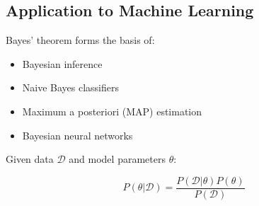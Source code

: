 \subsection{Application to Machine Learning}

Bayes' theorem forms the basis of:
\begin{itemize}
    \item Bayesian inference
    \item Naive Bayes classifiers
    \item Maximum a posteriori (MAP) estimation
    \item Bayesian neural networks
\end{itemize}

Given data $\mathcal{D}$ and model parameters $\theta$:

\begin{equation}
P(\theta|\mathcal{D}) = \frac{P(\mathcal{D}|\theta)P(\theta)}{P(\mathcal{D})}
\end{equation}
